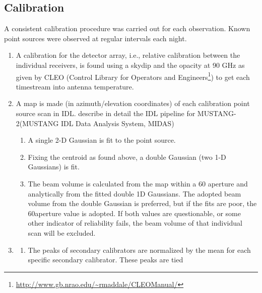 \documentclass[twocolumn]{aastex62}
\newcommand{\MUSTANG}{MUSTANG-2\xspace}
\begin{document}
\subsection{Calibration}


A consistent calibration procedure was carried out for each observation.
Known point sources were observed at regular intervals each night.

\begin{enumerate}
    \item A calibration for the detector array, i.e., relative calibration between
        the individual receivers, is found using a skydip and the
        opacity at 90 GHz as given by CLEO (Control Library for Operators and
        Engineers\footnote{\url{http://www.gb.nrao.edu/~rmaddale/CLEOManual/}}) to get
        each timestream into
        antenna temperature.
    \item A map is made (in azimuth/elevation coordinates) of each calibration
        point source scan in IDL.  \cite{Romero2019} describe in detail the IDL pipeline for \MUSTANG (MUSTANG IDL Data Analysis System, MIDAS)
        \begin{enumerate}
            \item A single 2-D Gaussian is fit to the point source. 
            \item Fixing the centroid as found above, a double Gaussian (two
                1-D Gaussians) is fit.
            \item The beam volume is calculated from the map within a 60\arcsec
                aperture and analytically from the fitted double 1D Gaussians. The
                adopted beam volume from the double Gaussian is preferred, but
                if the fits are poor, the 60\arcsec aperture value is 
                adopted. If both values are questionable, or some other
                indicator of reliability fails, the beam volume of that
                individual scan will be excluded.
        \end{enumerate}
    \item
        \begin{enumerate}
            \item The peaks of secondary calibrators are normalized by the mean
                for each specific secondary calibrator. These peaks are tied

\end{enumerate}
\end{enumerate}
\end{document}
